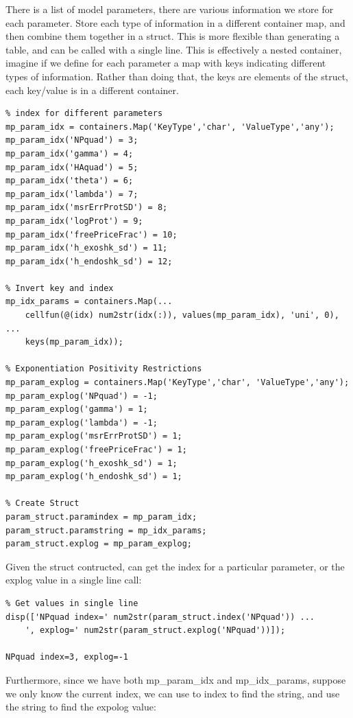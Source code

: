 \documentclass[
]{book}
\begin{document}
There is a list of model parameters, there are various information we
store for each parameter. Store each type of information in a different
container map, and then combine them together in a struct. This is more
flexible than generating a table, and can be called with a single line.
This is effectively a nested container, imagine if we define for each
parameter a map with keys indicating different types of information.
Rather than doing that, the keys are elements of the struct, each
key/value is in a different container.

\begin{verbatim}
% index for different parameters
mp_param_idx = containers.Map('KeyType','char', 'ValueType','any');
mp_param_idx('NPquad') = 3;
mp_param_idx('gamma') = 4;
mp_param_idx('HAquad') = 5;
mp_param_idx('theta') = 6;
mp_param_idx('lambda') = 7;
mp_param_idx('msrErrProtSD') = 8;
mp_param_idx('logProt') = 9;
mp_param_idx('freePriceFrac') = 10;
mp_param_idx('h_exoshk_sd') = 11;
mp_param_idx('h_endoshk_sd') = 12;

% Invert key and index
mp_idx_params = containers.Map(...
    cellfun(@(idx) num2str(idx(:)), values(mp_param_idx), 'uni', 0), ...
    keys(mp_param_idx));

% Exponentiation Positivity Restrictions
mp_param_explog = containers.Map('KeyType','char', 'ValueType','any');
mp_param_explog('NPquad') = -1;
mp_param_explog('gamma') = 1;
mp_param_explog('lambda') = -1;
mp_param_explog('msrErrProtSD') = 1;
mp_param_explog('freePriceFrac') = 1;
mp_param_explog('h_exoshk_sd') = 1;
mp_param_explog('h_endoshk_sd') = 1;

% Create Struct
param_struct.paramindex = mp_param_idx;
param_struct.paramstring = mp_idx_params;
param_struct.explog = mp_param_explog;
\end{verbatim}

Given the struct contructed, can get the index for a particular
parameter, or the explog value in a single line call:

\begin{verbatim}
% Get values in single line
disp(['NPquad index=' num2str(param_struct.index('NPquad')) ...
    ', explog=' num2str(param_struct.explog('NPquad'))]);

NPquad index=3, explog=-1
\end{verbatim}

Furthermore, since we have both mp\_param\_idx and mp\_idx\_params, suppose
we only know the current index, we can use to index to find the string,
and use the string to find the expolog value:
\end{document}
